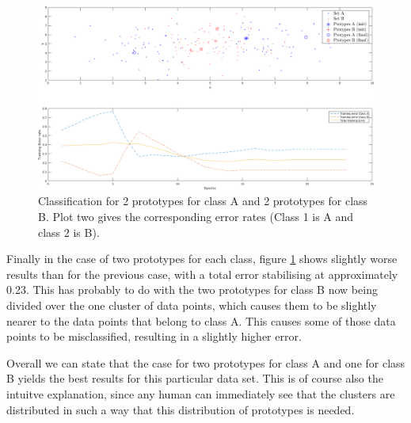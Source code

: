 \documentclass[10pt]{article}
\begin{document}
\begin{figure}[H]
 \centering
 \includegraphics[width=\textwidth]{Fig12_d.png}
 \caption{Classification for 2 prototypes for class A and 2 prototypes for class B. Plot two gives the corresponding error rates (Class 1 is A and class 2 is B).}
 \label{fig1.12d}
\end{figure}
Finally in the case of two prototypes for each class, figure \ref{fig1.12d} shows slightly worse results than for the previous case, with a total error stabilising at approximately 0.23. This has probably to do with the two prototypes for class B now being divided over the one cluster of data points, which causes them to be slightly nearer to the data points that belong to class A. This causes some of those data points to be misclassified, resulting in a slightly higher error.

\bigskip
\noindent Overall we can state that the case for two prototypes for class A and one for class B yields the best results for this particular data set. This is of course also the intuitve explanation, since any human can immediately see that the clusters are distributed in such a way that this distribution of prototypes is needed.
\end{document}
